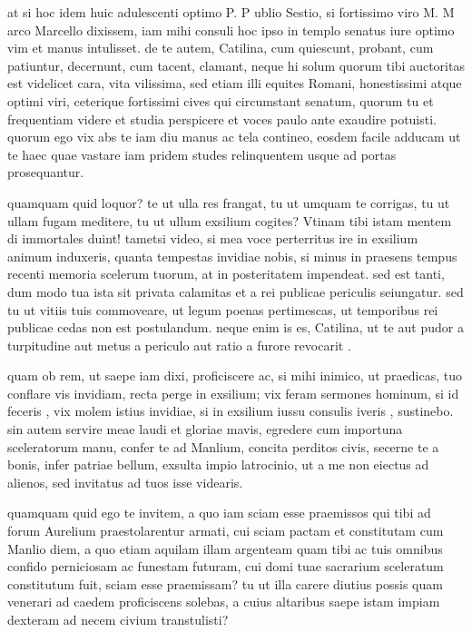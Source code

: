  at si hoc idem huic adulescenti optimo P. P ublio Sestio, si fortissimo viro M. M arco Marcello dixissem, iam mihi consuli hoc ipso in templo senatus iure optimo vim et manus intulisset. de te autem, Catilina, cum quiescunt, probant, cum patiuntur, decernunt, cum tacent, clamant, neque hi solum quorum tibi auctoritas est videlicet cara, vita vilissima, sed etiam illi equites Romani, honestissimi atque optimi viri, ceterique fortissimi cives qui circumstant senatum, quorum tu et frequentiam videre et studia perspicere et voces paulo ante exaudire potuisti. quorum ego vix abs te iam diu manus ac tela contineo, eosdem facile adducam ut te haec quae vastare iam pridem studes relinquentem usque ad portas prosequantur.

 quamquam quid loquor? te ut ulla res frangat, tu ut umquam te corrigas, tu ut ullam fugam meditere, tu ut ullum exsilium cogites? Vtinam tibi istam mentem di immortales duint! tametsi video, si mea voce perterritus ire in exsilium animum induxeris, quanta tempestas invidiae nobis, si minus in praesens tempus recenti memoria scelerum tuorum, at in posteritatem impendeat. sed est tanti, dum modo tua ista sit privata calamitas et a rei publicae periculis seiungatur. sed tu ut vitiis tuis commoveare, ut legum poenas pertimescas, ut temporibus rei publicae cedas non est postulandum. neque enim is es, Catilina, ut te aut pudor a turpitudine aut metus a periculo aut ratio a furore revocarit .

 quam ob rem, ut saepe iam dixi, proficiscere ac, si mihi inimico, ut praedicas, tuo conflare vis invidiam, recta perge in exsilium; vix feram sermones hominum, si id feceris , vix molem istius invidiae, si in exsilium iussu consulis iveris , sustinebo. sin autem servire meae laudi et gloriae mavis, egredere cum importuna sceleratorum manu, confer te ad Manlium, concita perditos civis, secerne te a bonis, infer patriae bellum, exsulta impio latrocinio, ut a me non eiectus ad alienos, sed invitatus ad tuos isse videaris.

 quamquam quid ego te invitem, a quo iam sciam esse praemissos qui tibi ad forum Aurelium praestolarentur armati, cui sciam pactam et constitutam cum Manlio diem, a quo etiam aquilam illam argenteam quam tibi ac tuis omnibus confido perniciosam ac funestam futuram, cui domi tuae sacrarium sceleratum constitutum fuit, sciam esse praemissam? tu ut illa carere diutius possis quam venerari ad caedem proficiscens solebas, a cuius altaribus saepe istam impiam dexteram ad necem civium transtulisti?

